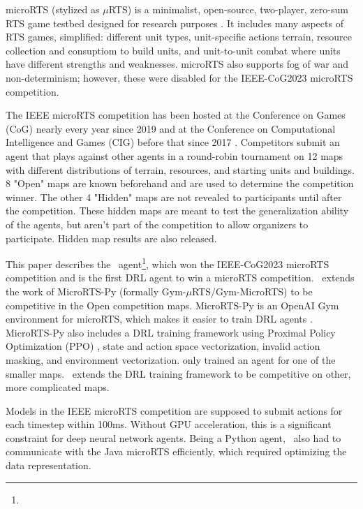 \documentclass{article}
\begin{document}
microRTS (stylized as $\mu$RTS) is a minimalist, open-source, two-player, zero-sum RTS game testbed designed for research
purposes \citep{Ontan2013TheCM}. It includes many aspects of RTS games, simplified: different unit types, unit-specific
actions terrain, resource collection and consuptiom to build units, and unit-to-unit combat
where units have different strengths and weaknesses. microRTS also supports fog of war
and non-determinism; however, these were disabled for the IEEE-CoG2023 microRTS
competition.

The IEEE microRTS competition has been hosted at the Conference on Games (CoG) nearly
every year since 2019 and at the Conference on Computational Intelligence and Games
(CIG) before that since 2017 \citep{Ontañón_Barriga_Silva_Moraes_Lelis_2018}.
Competitors submit an agent that plays against other agents in a round-robin tournament
on 12 maps with different distributions of terrain, resources, and starting units and
buildings. 8 "Open" maps are known beforehand and are used to determine the competition winner.
The other 4 "Hidden" maps are not revealed to participants until after the competition.
These hidden maps are meant to test the generalization ability of the agents, but aren't
part of the competition to allow organizers to participate. Hidden map results are also
released.

This paper describes the \agentName\ agent\footnote{\raiMicroRTSGitHubUrl}, which won the IEEE-CoG2023 microRTS
competition and is the first DRL agent to win a microRTS competition. \agentName\
extends the work of MicroRTS-Py (formally Gym-$\mu$RTS/Gym-MicroRTS) to be competitive
in the Open competition maps. MicroRTS-Py is an OpenAI Gym environment for microRTS,
which makes it easier to train DRL agents \citep{DBLP:journals/corr/abs-2105-13807}.
MicroRTS-Py also includes a DRL training framework using Proximal Policy Optimization
(PPO) \citep{DBLP:journals/corr/SchulmanWDRK17}, state and action space vectorization,
invalid action masking, and environment vectorization.
\citet{DBLP:journals/corr/abs-2105-13807} only trained an agent for one of the smaller
maps. \agentName\ extends the DRL training framework to be competitive on other, more
complicated maps.

Models in the IEEE microRTS competition are supposed to submit actions for each timestep
within 100ms. Without GPU acceleration, this is a significant constraint for deep neural
network agents. Being a Python agent, \agentName\ also had to communicate with the Java
microRTS efficiently, which required optimizing the data representation.
\end{document}
